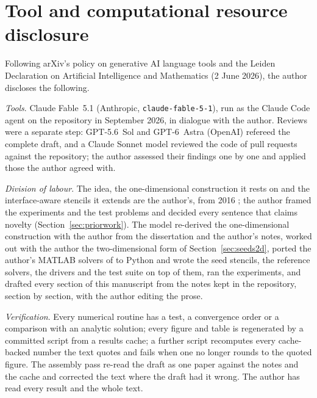 \documentclass[11pt]{amsart}
\theoremstyle{definition}
\theoremstyle{remark}
\newcommand{\para}[1]{\par\smallskip\noindent\textit{#1}.\enspace}
\begin{document}
\section*{Tool and computational resource disclosure}
Following arXiv's policy on generative AI language tools and the Leiden
Declaration on Artificial Intelligence and Mathematics (2 June 2026), the
author discloses the following.

\para{Tools}
Claude Fable~5.1 (Anthropic, \texttt{claude-fable-5-1}), run as the Claude
Code agent on the repository in September 2026, in dialogue with the
author. Reviews were a separate step: GPT-5.6~Sol and GPT-6~Astra (OpenAI)
refereed the complete draft, and a Claude Sonnet model reviewed the code of
pull requests against the repository; the author assessed their findings
one by one and applied those the author agreed with.

\para{Division of labour}
The idea, the one-dimensional construction it rests on and the
interface-aware stencils it extends are the author's, from 2016
\cite{Martin2016,MartinFornberg2017}; the author framed the experiments
and the test problems and decided every sentence that claims novelty
(Section~\ref{sec:priorwork}). The model re-derived the one-dimensional
construction with the author from the dissertation and the author's notes,
worked out with the author the two-dimensional form of
Section~\ref{sec:seeds2d}, ported the author's MATLAB solvers of
\cite{Martin2016} to Python and wrote the seed stencils, the reference
solvers, the drivers and the test suite on top of them, ran the
experiments, and drafted every section of this manuscript from the notes
kept in the repository, section by section, with the author editing the
prose.

\para{Verification}
Every numerical routine has a test, a convergence order or a comparison
with an analytic solution; every figure and table is regenerated by a
committed script from a results cache; a further script recomputes every
cache-backed number the text quotes and fails when one no longer rounds to
the quoted figure. The assembly pass re-read the draft as one paper
against the notes and the cache and corrected the text where the draft had
it wrong. The author has read every result and the whole text.
\end{document}
